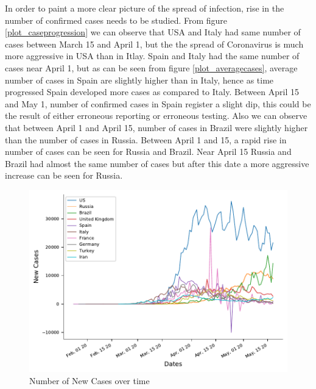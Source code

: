 \documentclass[12pt, twosided]{report}  %
\begin{document}
In order to paint a more clear picture of the spread of infection, rise in the number of confirmed cases needs to be studied. From figure \ref{plot_caseprogression} we can observe that USA and Italy had same number of cases between March 15 and April 1, but the the spread of Coronavirus is much more aggressive in USA than in Itlay. Spain and Italy had the same number of cases near April 1, but as can be seen from figure \ref{plot_averagecases}, average number of cases in Spain are slightly higher than in Italy, hence as time progressed Spain developed more cases as compared to Italy. Between April 15 and May 1, number of confirmed cases in Spain register a slight dip, this could be the result of either erroneous reporting or erroneous testing. Also we can observe that between April 1 and April 15, number of cases in Brazil were slightly higher than the number of cases in Russia. Between April 1 and 15, a rapid rise in number of cases can be seen for Russia and Brazil. Near April 15 Russia and Brazil had almost the same number of cases but after this date a more aggressive increase can be seen for Russia.

\begin{figure}[H]
	\centering
	\includegraphics[width=0.5\linewidth]{./images/plot-4.pdf}
	\caption{Number of New Cases over time}
	\label{plot_newcases}
\end{figure}
\end{document}
